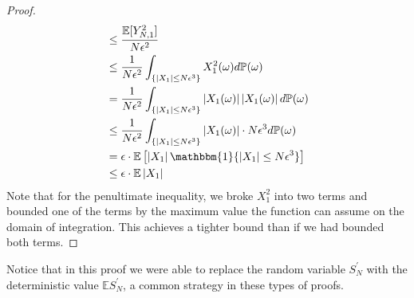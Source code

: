 \documentclass[12pt]{article}
\newcommand*{\abs}[1]{\left\lvert#1\right\rvert}
\newcommand{\E}{\mathbb{E}}
\newcommand{\Prob}{\mathbb{P}}
\begin{document}
\begin{proof}
\begin{align*}
							      &\leq  \frac{\E[Y_{N,1}^2]}{N\epsilon^2} \\
							      &\leq \frac{1}{N\epsilon^2} \int_{\{\abs{X_1} \leq N\epsilon^3\}} X_1^2(\omega) d\Prob(\omega) \\
							      &= \frac{1}{N\epsilon^2} \int_{\{\abs{X_1} \leq N\epsilon^3\}} \abs{X_1(\omega)}\abs{X_1(\omega)} d\Prob(\omega) \\
							      &\leq \frac{1}{N\epsilon^2} \int_{\{\abs{X_1} \leq N\epsilon^3\}} \abs{X_1(\omega)} \cdot N\epsilon^3 d\Prob(\omega) \\
							      &= \epsilon \cdot \E\left[\abs{X_1}\mathbbm{1}\{\abs{X_1} \leq N\epsilon^3\} \right] \\ 
							      &\leq \epsilon \cdot \E\abs{X_1}
 \end{align*}
 Note that for the penultimate inequality, we broke $X_1^2$ into two terms and bounded one of the terms by the maximum value the function can assume on the domain of integration. This achieves a tighter bound 
 than if we had bounded both terms. 
 
 
\end{proof}
Notice that in this proof we were able to replace the random variable $S_N^\prime$ with the deterministic value $\E S_N^\prime$, a common strategy in these types of proofs.  
\end{document}
